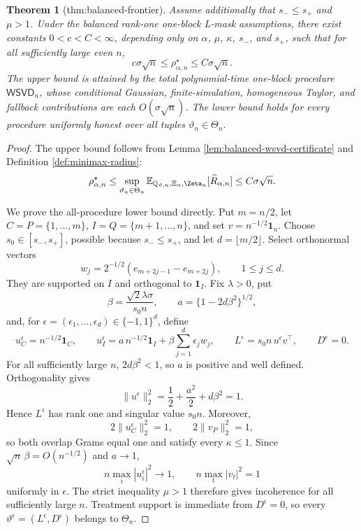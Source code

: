 \documentclass{article}
\newtheorem{theorem}{Theorem}
\begin{document}
\begin{theorem}[thm:balanced-frontier]\label{thm:balanced-frontier}
Assume additionally that \(s_-\le s_+\) and \(\mu>1\). Under the balanced rank-one one-block L-mask assumptions, there exist constants \(0<c<C<\infty\), depending only on \(\alpha\), \(\mu\), \(\kappa\), \(s_-\), and \(s_+\), such that for all sufficiently large even \(n\),
\[
c\sigma\sqrt n\le\rho_{\alpha,n}^{\star}\le C\sigma\sqrt n.
\]
The upper bound is attained by the total polynomial-time one-block procedure \(\mathsf{WSVD}_n\), whose conditional Gaussian, finite-simulation, homogeneous Taylor, and fallback contributions are each \(O(\sigma\sqrt n)\). The lower bound holds for every procedure uniformly honest over all tuples \(\vartheta_n\in\Theta_n\).
\end{theorem}
\begin{proof}
The upper bound follows from Lemma \ref{lem:balanced-wsvd-certificate} and Definition \ref{def:minimax-radius}:
\[
\rho_{\alpha,n}^{\star}
\le\sup_{\vartheta_n\in\Theta_n}
\mathbb E_{\mathbb Q_{\vartheta,n},\Xi_n,\Zeta_n}
[\widehat R_{\alpha,n}]
\le C\sigma\sqrt n.
\]

We prove the all-procedure lower bound directly.  Put \(m=n/2\), let
\(C=P=\{1,\ldots,m\}\), \(I=Q=\{m+1,\ldots,n\}\), and set
\(v=n^{-1/2}\mathbf1_n\).  Choose \(s_0\in[s_-,s_+]\), possible because
\(s_-\le s_+\), and let \(d=\lfloor m/2\rfloor\).  Select orthonormal vectors
\[
w_j=2^{-1/2}(e_{m+2j-1}-e_{m+2j}),
\qquad 1\le j\le d.
\]
They are supported on \(I\) and orthogonal to \(\mathbf1_I\).  Fix
\(\lambda>0\), put
\[
\beta=\frac{\sqrt2\lambda\sigma}{s_0n},
\qquad
a=\{1-2d\beta^2\}^{1/2},
\]
and, for \(\epsilon=(\epsilon_1,\ldots,\epsilon_d)\in\{-1,1\}^d\), define
\[
u_C^\epsilon=n^{-1/2}\mathbf1_C,
\qquad
u_I^\epsilon=a\,n^{-1/2}\mathbf1_I
+\beta\sum_{j=1}^d\epsilon_jw_j,
\qquad
L^\epsilon=s_0n\,u^\epsilon v^{\top},
\qquad
D^\epsilon=0.
\]
For all sufficiently large \(n\), \(2d\beta^2<1\), so \(a\) is positive and well defined.  Orthogonality gives
\[
\lVert u^\epsilon\rVert_2^2
=\frac12+\frac{a^2}{2}+d\beta^2=1.
\]
Hence \(L^\epsilon\) has rank one and singular value \(s_0n\).  Moreover,
\[
2\lVert u_C^\epsilon\rVert_2^2=1,
\qquad
2\lVert v_P\rVert_2^2=1,
\]
so both overlap Grams equal one and satisfy every \(\kappa\le1\).  Since
\(\sqrt n\,\beta=O(n^{-1/2})\) and \(a\to1\),
\[
n\max_i|u_i^\epsilon|^2\longrightarrow1,
\qquad
n\max_t|v_t|^2=1
\]
uniformly in \(\epsilon\).  The strict inequality \(\mu>1\) therefore gives incoherence for all sufficiently large \(n\).  Treatment support is immediate from \(D^\epsilon=0\), so every
\(\vartheta^\epsilon=(L^\epsilon,D^\epsilon)\) belongs to \(\Theta_n\).


\end{proof}
\end{document}

